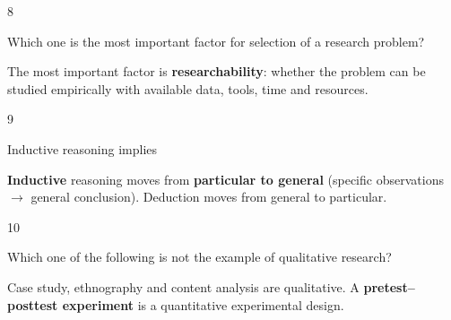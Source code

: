 \begin{question}{8}
{Which one is the most important factor for selection of a research problem?\par}
\begin{explain}
The most important factor is \textbf{researchability}: whether the problem can be studied empirically with available data, tools, time and resources.
\end{explain}
\end{question}

\begin{question}{9}
{Inductive reasoning implies\par}
\begin{explain}
\textbf{Inductive} reasoning moves from \textbf{particular to general} (specific observations $\rightarrow$ general conclusion). Deduction moves from general to particular.
\end{explain}
\end{question}

\begin{question}{10}
{Which one of the following is not the example of qualitative research?\par}
\begin{explain}
Case study, ethnography and content analysis are qualitative. A \textbf{pretest--posttest experiment} is a quantitative experimental design.
\end{explain}
\end{question}

